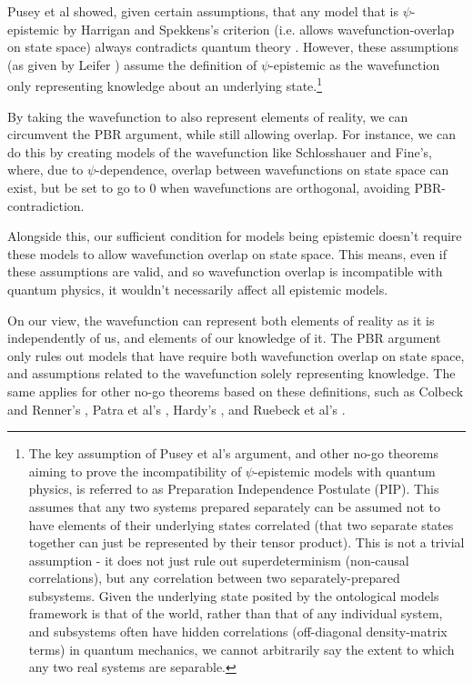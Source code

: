\documentclass[superscriptaddress, floatfix,nofootinbib,12pt]{revtex4-2}
\begin{document}
Pusey et al showed, given certain assumptions, that any model that is $\psi$-epistemic by Harrigan and Spekkens's criterion (i.e. allows wavefunction-overlap on state space) always contradicts quantum theory \cite{Pusey2012OnTheReality}. However, these assumptions (as given by Leifer \cite{Leifer2014Review}) assume the definition of $\psi$-epistemic as the wavefunction only representing knowledge about an underlying state.\footnote{The key assumption of Pusey et al's argument, and other no-go theorems aiming to prove the incompatibility of $\psi$-epistemic models with quantum physics, is referred to as Preparation Independence Postulate (PIP). This assumes that any two systems prepared separately can be assumed not to have elements of their underlying states correlated (that two separate states together can just be represented by their tensor product). This is not a trivial assumption \cite{Lewis2012Compatible} - it does not just rule out superdeterminism (non-causal correlations), but any correlation between two separately-prepared subsystems. Given the underlying state posited by the ontological models framework is that of the world, rather than that of any individual system, and subsystems often have hidden correlations (off-diagonal density-matrix terms) in quantum mechanics, we cannot arbitrarily say the extent to which any two real systems are separable.}

By taking the wavefunction to also represent elements of reality, we can circumvent the PBR argument, while still allowing overlap. For instance, we can do this by creating models of the wavefunction like Schlosshauer and Fine's, where, due to $\psi$-dependence, overlap between wavefunctions on state space can exist, but be set to go to 0 when wavefunctions are orthogonal, avoiding PBR-contradiction.

Alongside this, our sufficient condition for models being epistemic doesn't require these models to allow wavefunction overlap on state space. This means, even if these assumptions are valid, and so wavefunction overlap is incompatible with quantum physics, it wouldn't necessarily affect all epistemic models.

On our view, the wavefunction can represent both elements of reality as it is independently of us, and elements of our knowledge of it. The PBR argument only rules out models that have require both wavefunction overlap on state space, and assumptions related to the wavefunction solely representing knowledge. The same applies for other no-go theorems based on these definitions, such as Colbeck and Renner's \cite{Colbeck2012Correspondence}, Patra et al's \cite{Patra2013NoGo}, Hardy's \cite{Hardy2013QStatesReal}, and Ruebeck et al's \cite{Ruebeck2020Epistemic}.
\end{document}
